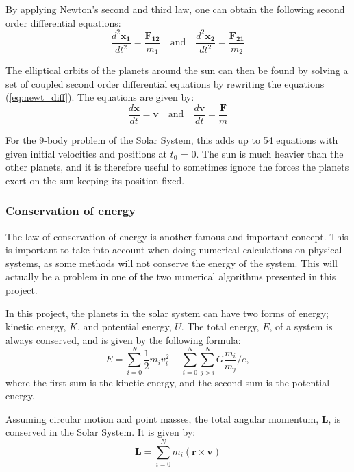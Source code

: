 \documentclass[10pt,a4paper,titlepage]{article}
\begin{document}
By applying Newton's second and third law, one can obtain the following second order differential equations:
\begin{equation}
\label{eq:newt_diff}
\frac{d^2\mathbf{x_1}}{dt^2} = \frac{\mathbf{F_{12}}}{m_1} \quad \mathrm{and} \quad \frac{d^2\mathbf{x_2}}{dt^2} = \frac{\mathbf{F_{21}}}{m_2}
\end{equation}

The elliptical orbits of the planets around the sun can then be found by solving a set of coupled second order differential equations by rewriting the equations (\ref{eq:newt_diff}). The equations are given by:
\begin{equation}
\frac{d\mathbf{x}}{dt}=\mathbf{v} \quad  \mathrm{and} \quad \frac{d\mathbf{v}}{dt}=\frac{\mathbf{F}}{m}
\end{equation}

For the 9-body problem of the Solar System, this adds up to 54 equations with given initial velocities and positions at $t_0$ = 0. The sun is much heavier than the other planets, and it is therefore useful to sometimes ignore the forces the planets exert on the sun keeping its position fixed. 

\subsubsection{Conservation of energy}
The law of conservation of energy is another famous and important concept. This is important to take into account when doing numerical calculations on physical systems, as some methods will not conserve the energy of the system. This will actually be a problem in one of the two numerical algorithms presented in this project. 

In this project, the planets in the solar system can have two forms of energy; kinetic energy, $K$, and potential energy, $U$. The total energy, $E$, of a system is always conserved, and is given by the following formula:
\begin{equation}
\label{eq:totalE}
E = \sum_{i=0}^{N}\frac{1}{2}m_i v_i^2-\sum_{i=0}^{N}\sum_{j>i}^{N}G\frac{m_i}{m_j}/e,
\end{equation}
where the first sum is the kinetic energy, and the second sum is the potential energy. 

Assuming circular motion and point masses, the total angular momentum, $\mathbf{L}$, is conserved in the Solar System. It is given by:
\begin{equation}
\mathbf{L}=\sum_{i=0}^{N}m_{i}(\mathbf{r}\times\mathbf{v})
\end{equation}
\end{document}

